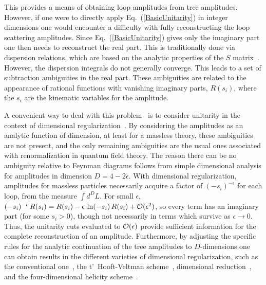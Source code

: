 This provides a means of obtaining loop amplitudes from tree
amplitudes.  However, if one were to directly apply
Eq.~(\ref{BasicUnitarity}) in integer dimensions one would encounter a
difficulty with fully reconstructing the loop scattering amplitudes.
Since Eq.~(\ref{BasicUnitarity}) gives only the imaginary part one
then needs to reconstruct the real part.  This is traditionally done
via dispersion relations, which are based on the analytic properties of
the $S$ matrix~\cite{Mandelstam58,Landau59,Mandelstam59,Cutkosky60}.
However, the dispersion integrals do not generally converge. This
leads to a set of subtraction ambiguities in the real part.  These
ambiguities are related to the appearance of rational functions with
vanishing imaginary parts, $R(s_{i})$, where the $s_{i}$ are the
kinematic variables for the amplitude.

A convenient way to deal with this
problem~\cite{Bern94SusyFour,Bern95SusyFour,BernMorgan,Review,Rozowsky}
is to consider unitarity in the context of dimensional
regularization~\cite{HV,vanNeerven}.  By considering the amplitudes as
an analytic function of dimension, at least for a massless theory,
these ambiguities are not present, and the only remaining ambiguities
are the usual ones associated with renormalization in quantum field
theory.  The reason there can be no ambiguity relative to Feynman
diagrams follows from simple dimensional analysis for amplitudes in
dimension $D=4-2 \epsilon$.  With dimensional regularization,
amplitudes for massless particles necessarily acquire a factor of
$(-s_{i})^{-\epsilon}$ for each loop, from the measure $\int d^DL$.
For small $\epsilon$, $(-s_{i})^{-\epsilon} \, R(s_{i}) = R(s_{i}) -
\epsilon \, \ln (-s_{i}) \, R(s_{i}) + {\cal O}(\epsilon^2)$, so every
term has an imaginary part (for some $s_{i}>0$), though not
necessarily in terms which survive as $\epsilon\rightarrow 0$.  Thus,
the unitarity cuts evaluated to ${\cal O}(\epsilon)$ provide
sufficient information for the complete reconstruction of an
amplitude.  Furthermore, by adjusting the specific rules for the
analytic continuation of the tree amplitudes to $D$-dimensions one can
obtain results in the different varieties of dimensional
regularization, such as the conventional one~\cite{CollinsBook}, the
t'~Hooft-Veltman scheme~\cite{HV}, dimensional
reduction~\cite{Siegel79DR}, and the four-dimensional helicity
scheme~\cite{Long,TwoloopFDH}.

